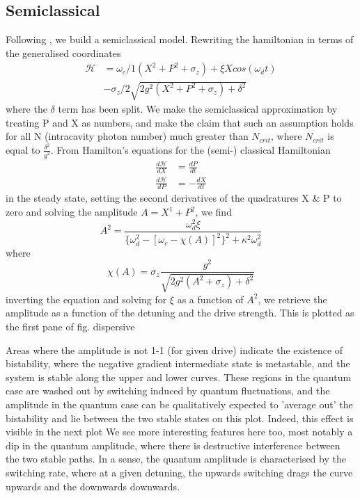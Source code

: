 \subsection{Semiclassical}
Following \cite{Bishop2010}, we build a semiclassical model.
Rewriting the hamiltonian in terms of the generalised coordinates
\begin{align}
        \mathscr{H} &= \omega_c/1 (X^2 + P^2 + \sigma_z) + \xi X cos(\omega_d t)\\
                    & - \sigma_z /2 \sqrt{2g^2(X^2+P^2+\sigma_z) + \delta^2}
\end{align}
where the $\delta$ term has been split. We make the semiclassical approximation by treating P and X as numbers, and make the claim that such an assumption holds for all N (intracavity photon number) much greater than $N_{crit}$, where $N_{crit}$ is equal to $\frac{\delta^2}{g^2}$.
From Hamilton's equations for the (semi-) classical Hamiltonian
\begin{align}
        \frac{d\mathscr{H}}{dX} &= \frac{dP}{dt}\\
        \frac{d\mathscr{H}}{dP} &= -\frac{dX}{dt}
\end{align}
in the steady state, setting the second derivatives of the quadratures X \& P to zero and solving the amplitude $A = X^1 + P^2$, we find
\begin{equation}
        A^2 = \frac{\omega_d^2\xi}{\{\omega_d^2 - [\omega_c - \chi (A) ]^2 \}^2+ \kappa^2 \omega_d^2}
\end{equation}
where
\begin{equation}
        \chi(A) = \sigma_z \frac{g^2}{\sqrt{2g^2(A^2 + \sigma_z) + \delta^2}}
\end{equation}
inverting the equation and solving for $\xi$ as a function of $A^2$, we retrieve the amplitude as a function of the detuning and the drive strength. 
This is plotted as the first pane of fig. dispersive 

Areas where the amplitude is not 1-1 (for given drive) indicate the existence of bistability, where the negative gradient intermediate state is metastable, and the system is stable along the upper and lower curves.
These regions in the quantum case are washed out by switching induced by quantum fluctuations, and the amplitude in the quantum case can be qualitatively expected to 'average out' the bistability and lie between the two stable states on this plot.
Indeed, this effect is visible in the next plot
We see more interesting features here too, most notably a dip in the quantum amplitude, where there is destructive interference between the two stable paths.
In a sense, the quantum amplitude is characterised by the switching rate, where at a given detuning, the upwards switching drags the curve upwards and the downwards downwards.

